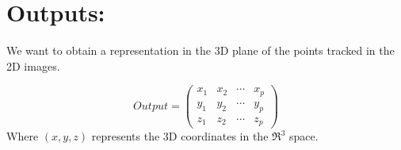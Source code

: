 \section{Outputs:}
We want to obtain a representation in the 3D plane of the points tracked in the 2D images.

\begin{equation}
Output=
\begin{pmatrix}
x_{1} & x_{2} & \cdots & x_{p}\\
y_{1} & y_{2} & \cdots & y_{p}\\
z_{1} & z_{2} & \cdots & z_{p}
\end{pmatrix}
\end{equation}
Where $(x,y,z)$ represents the 3D coordinates in the $\Re^{3}$ space.